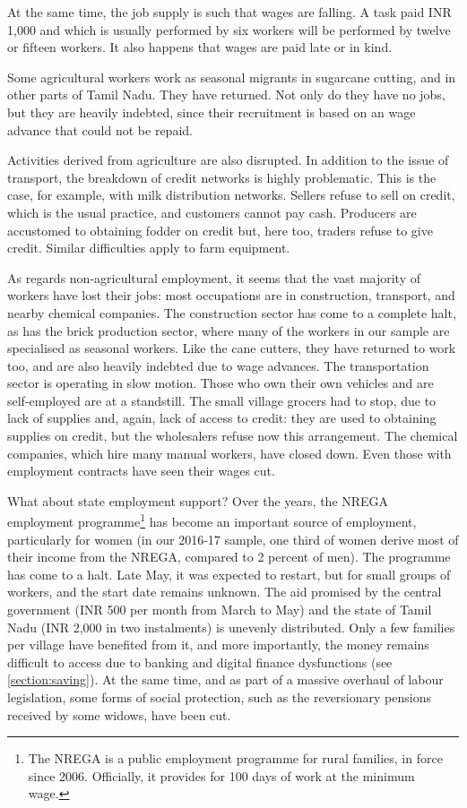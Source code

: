 \documentclass[a4paper, 11pt, onecolumn]{article}
\begin{document}
At the same time, the job supply is such that wages are falling. 
A task paid INR 1,000 and which is usually performed by six workers will be performed by twelve or fifteen workers. 
It also happens that wages are paid late or in kind. 

Some agricultural workers work as seasonal migrants in sugarcane cutting, and in other parts of Tamil Nadu. 
They have returned. 
Not only do they have no jobs, but they are heavily indebted, since their recruitment is based on an wage advance that could not be repaid.

Activities derived from agriculture are also disrupted. 
In addition to the issue of transport, the breakdown of credit networks is highly problematic. 
This is the case, for example, with milk distribution networks. 
Sellers refuse to sell on credit, which is the usual practice, and customers cannot pay cash. 
Producers are accustomed to obtaining fodder on credit but, here too, traders refuse to give credit. 
Similar difficulties apply to farm equipment. 

As regards non-agricultural employment, it seems that the vast majority of workers have lost their jobs: most occupations are in construction, transport, and nearby chemical companies. 
The construction sector has come to a complete halt, as has the brick production sector, where many of the workers in our sample are specialised as seasonal workers. Like the cane cutters, they have returned to work too, and are also heavily indebted due to wage advances. 
The transportation sector is operating in slow motion. 
Those who own their own vehicles and are self-employed are at a standstill. 
The small village grocers had to stop, due to lack of supplies and, again, lack of access to credit: they are used to obtaining supplies on credit, but the wholesalers refuse now this arrangement. 
The chemical companies, which hire many manual workers, have closed down. 
Even those with employment contracts have seen their wages cut.

What about state employment support? Over the years, the NREGA employment programme\footnote{The NREGA is a public employment programme for rural families, in force since 2006. Officially, it provides for 100 days of work at the minimum wage.} has become an important source of employment, particularly for women (in our 2016-17 sample, one third of women derive most of their income from the NREGA, compared to 2 percent of men). 
The programme has come to a halt. 
Late May, it was expected to restart, but for small groups of workers, and the start date remains unknown. 
The aid promised by the central government (INR 500 per month from March to May) and the state of Tamil Nadu (INR 2,000 in two instalments) is unevenly distributed. 
Only a few families per village have benefited from it, and more importantly, the money remains difficult to access due to banking and digital finance dysfunctions (see \ref{section:saving}). 
At the same time, and as part of a massive overhaul of labour legislation, some forms of social protection, such as the reversionary pensions received by some widows, have been cut.
\end{document}
